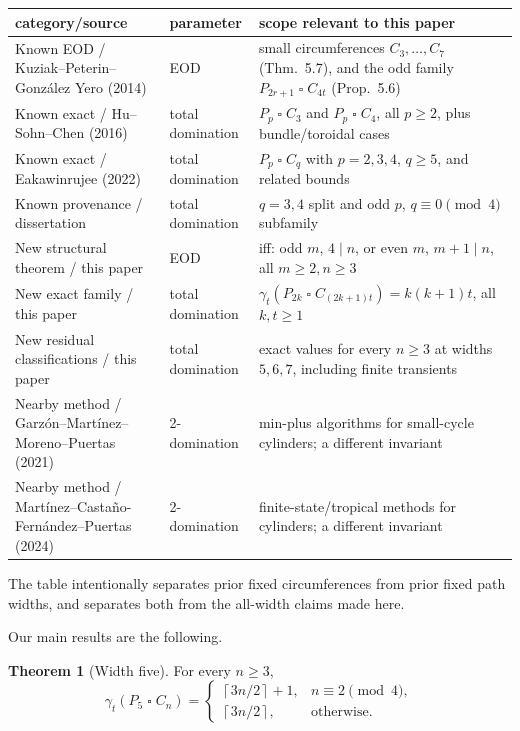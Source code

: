 \documentclass[11pt]{article}
\theoremstyle{definition}
\newtheorem{theorem}{Theorem}[section]
\newcommand{\gt}{\gamma_t}
\newcommand{\sq}{\mathbin{\square}}
\begin{document}
\begin{center}
\small
\begin{tabular}{p{}p{}p{}}
\toprule
category/source & parameter & scope relevant to this paper\\
\midrule
Known EOD / Kuziak--Peterin--González Yero (2014) & EOD & small circumferences \(C_3,\ldots,C_7\) (Thm.~5.7), and the odd family \(P_{2r+1}\sq C_{4t}\) (Prop.~5.6)\\
Known exact / Hu--Sohn--Chen (2016) & total domination & \(P_p\sq C_3\) and \(P_p\sq C_4\), all \(p\ge2\), plus bundle/toroidal cases\\
Known exact / Eakawinrujee (2022) & total domination & \(P_p\sq C_q\) with \(p=2,3,4\), \(q\ge5\), and related bounds\\
Known provenance / dissertation & total domination & \(q=3,4\) split and odd \(p\), \(q\equiv0\pmod4\) subfamily\\
New structural theorem / this paper & EOD & iff: odd \(m\), \(4\mid n\), or even \(m\), \(m+1\mid n\), all \(m\ge2,n\ge3\)\\
New exact family / this paper & total domination & \(\gt(P_{2k}\sq C_{(2k+1)t})=k(k+1)t\), all \(k,t\ge1\)\\
New residual classifications / this paper & total domination & exact values for every \(n\ge3\) at widths \(5,6,7\), including finite transients\\
Nearby method / Garzón--Martínez--Moreno--Puertas (2021) & 2-domination & min-plus algorithms for small-cycle cylinders; a different invariant\\
Nearby method / Martínez--Castaño-Fernández--Puertas (2024) & 2-domination & finite-state/tropical methods for cylinders; a different invariant\\
\bottomrule
\end{tabular}
\normalsize
\end{center}

The table intentionally separates prior fixed circumferences from prior
fixed path widths, and separates both from the all-width claims made here.

Our main results are the following.

\begin{theorem}[Width five]\label{thm:w5}
For every \(n\geq3\),
\[
\gt(P_5\sq C_n)=
\begin{cases}
\left\lceil 3n/2\right\rceil+1,&n\equiv2\pmod4,\\
\left\lceil 3n/2\right\rceil,&\text{otherwise}.
\end{cases}
\]
\end{theorem}
\end{document}
